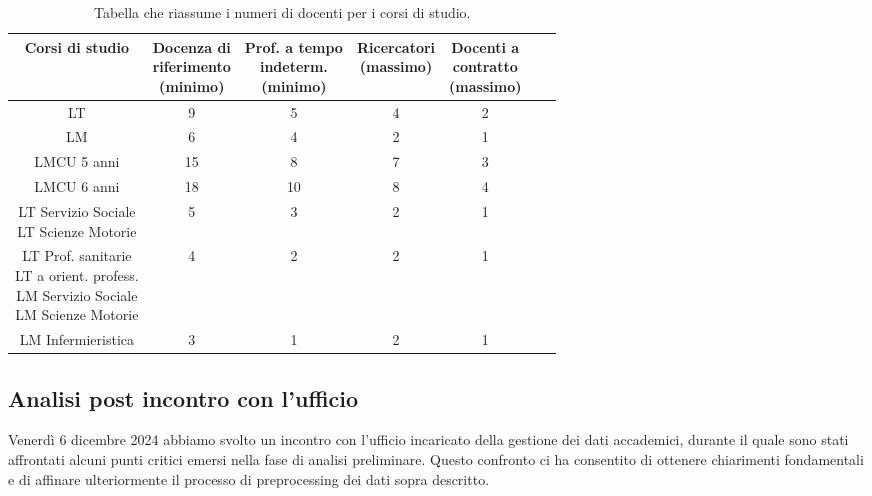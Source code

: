 \begin{table}[h!]
    \centering
    \renewcommand{\arraystretch}{1.8}
    \begin{tabular}{|c|c|c|c|c|c|c|}
    \hline
    Corsi di studio & \makecell{Docenza di \\riferimento \\(\textbf{minimo})} & \makecell{Prof. a tempo\\indeterm.\\(\textbf{minimo})} & \makecell{Ricercatori\\(\textbf{massimo})} & \makecell{Docenti a\\contratto\\(\textbf{massimo})} \\
    \hline
    LT & 9 & 5 & 4 & 2 \\
    \hline 
    LM & 6 & 4 & 2 & 1 \\
    \hline
    LMCU 5 anni & 15 & 8 & 7 & 3 \\
    \hline
    LMCU 6 anni & 18 & 10 & 8 & 4 \\
    \hline
    \makecell{LT Servizio Sociale\\LT Scienze Motorie} & 5 & 3 & 2 & 1 \\
    \hline
    \makecell{LT Prof. sanitarie\\LT a orient. profess.\\LM Servizio Sociale\\LM Scienze Motorie} & 4 & 2 & 2 & 1 \\
    \hline
    LM Infermieristica & 3 & 1 & 2 & 1 \\
    \hline
    \end{tabular}
    \caption{Tabella che riassume i numeri di docenti per i corsi di studio.}
    \label{tab:casi-particolari}
\end{table}
    

\subsection{Analisi post incontro con l'ufficio}
\label{sec:analisi-post-call}

Venerdì 6 dicembre 2024 abbiamo svolto un incontro con l'ufficio incaricato della gestione dei dati accademici,
durante il quale sono stati affrontati alcuni punti critici emersi nella fase di analisi preliminare.
Questo confronto ci ha consentito di ottenere chiarimenti fondamentali e di affinare ulteriormente il
processo di preprocessing dei dati sopra descritto.

